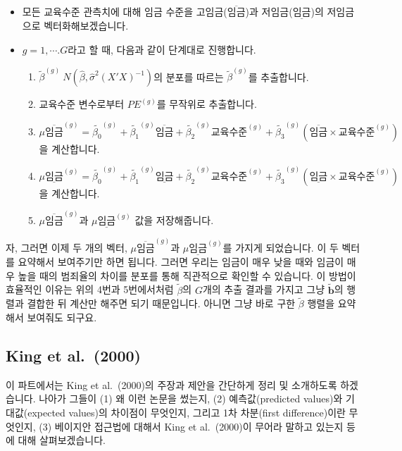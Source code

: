 \documentclass[
]{book}
\begin{document}
\begin{itemize}
\item
  모든 교육수준 관측치에 대해 임금 수준을 고임금(\(\overline{\text{임금}}\))과 저임금(\(\underline{\text{임금}}\))의 저임금으로 벡터화해보겠습니다.
\item
  \(g = 1, \cdots. G\)라고 할 때, 다음과 같이 단계대로 진행합니다.

  \begin{enumerate}
  \def\labelenumi{\arabic{enumi}.}
  \item
    \(\tilde{\beta}^{(g)} ~ N(\hat{\beta}, \hat{\sigma}^2(X'X)^{-1})\)의 분포를 따르는 \(\tilde{\beta}^{(g)}\)를 추출합니다.
  \item
    교육수준 변수로부터 \(PE^{(g)}\)를 무작위로 추출합니다.
  \item
    \(\mu \overline{\text{임금}}^{(g)} = \tilde{\beta_0}^{(g)} + \tilde{\beta_1}^{(g)}\overline{\text{임금}} + \tilde{\beta_2}^{(g)}\text{교육수준}^{(g)} + \tilde{\beta_3}^{(g)}(\overline{\text{임금}}\times\text{교육수준}^{(g)})\)을 계산합니다.
  \item
    \(\mu \underline{\text{임금}}^{(g)} = \tilde{\beta_0}^{(g)} + \tilde{\beta_1}^{(g)}\underline{\text{임금}} + \tilde{\beta_2}^{(g)}\text{교육수준}^{(g)} + \tilde{\beta_3}^{(g)}(\underline{\text{임금}}\times\text{교육수준}^{(g)})\)을 계산합니다.
  \item
    \(\mu \overline{\text{임금}}^{(g)}\)과 \(\mu \underline{\text{임금}}^{(g)}\) 값을 저장해줍니다.
  \end{enumerate}
\end{itemize}

자, 그러면 이제 두 개의 벡터, \(\mu \overline{\text{임금}}^{(g)}\)과 \(\mu \underline{\text{임금}}^{(g)}\)를 가지게 되었습니다. 이 두 벡터를 요약해서 보여주기만 하면 됩니다. 그러면 우리는 임금이 매우 낮을 때와 임금이 매우 높을 때의 범죄율의 차이를 분포를 통해 직관적으로 확인할 수 있습니다. 이 방법이 효율적인 이유는 위의 4번과 5번에서처럼 \(\tilde{\beta}\)의 \(G\)개의 추출 결과를 가지고 그냥 \(\tilde{\textbf{b}}\)의 행렬과 결합한 뒤 계산만 해주면 되기 때문입니다. 아니면 그냥 바로 구한 \(\tilde{\beta}\) 행렬을 요약해서 보여줘도 되구요.

\hypertarget{king-et-al.-2000}{%
\subsection{King et al.~(2000)}\label{king-et-al.-2000}}

이 파트에서는 King et al.~(2000)의 주장과 제안을 간단하게 정리 및 소개하도록 하겠습니다. 나아가 그들이 (1) 왜 이런 논문을 썼는지, (2) 예측값(predicted values)와 기대값(expected values)의 차이점이 무엇인지, 그리고 1차 차분(first difference)이란 무엇인지, (3) 베이지안 접근법에 대해서 King et al.~(2000)이 무어라 말하고 있는지 등에 대해 살펴보겠습니다.
\end{document}
